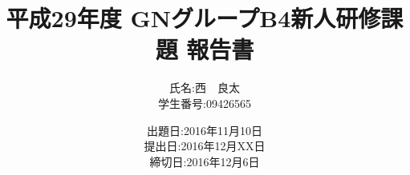 \documentclass[11pt]{jarticle}
\begin{document}
\title{平成29年度 GNグループB4新人研修課題 報告書}
\date{出題日:2016年11月10日\\提出日:2016年12月XX日\\締切日:2016年12月6日\\}
\author{氏名:西　良太\\学生番号:09426565}
\maketitle
\end{document}
